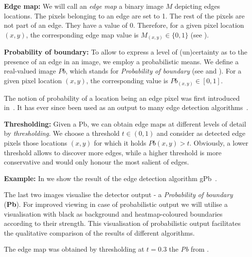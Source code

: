 \textbf{Edge map:} We will call an \textit{edge map} a binary image $M$ depicting edges locations. The pixels belonging to an edge are set to 1. The rest of the pixels are not part of an edge. They have a value of 0. Therefore, for a given pixel location $(x,y)$, the corresponding edge map value is $M_{(x,y)} \in \{0,1\}$ (see ).

\textbf{Probability of boundary:} To allow to express a level of (un)certainty as to the presence of an edge in an image, we employ a probabilistic means. We define a real-valued image $Pb$, which stands for \textit{Probability of boundary} (see  and ). For a given pixel location $(x,y)$, the corresponding value is $Pb_{(x,y)} \in [0,1]$.

The notion of probability of a location being an edge pixel was first introduced in~\cite{martin2004learning}. %
It has ever since been used as an output to many edge detection algorithms~\cite{Maire2008using,LimZD13,DollarICCV13edges,Isola2014crisp,Ganin2014n4fields,Hallman2014}.

\textbf{Thresholding:} Given a Pb, we can obtain edge maps at different levels of detail by {\it thresholding}. We choose a threshold $t\in(0,1)$ and consider as detected edge pixels those locations $(x,y)$ for which it holds %
$Pb(x,y)>t$. Obviously, a lower threshold allows to discover more edges, while a higher threshold is more conservative and would only honour the most salient of edges.

\textbf{Example:} In  we show the result of the edge detection algorithm gPb~\cite{Arbelaez11}.

The last two images visualise the detector output - a {\it Probability of boundary} ({\bf Pb}). For improved viewing in case of probabilistic output we will utilise a visualisation with black as background and heatmap-coloured boundaries according to their strength. This visualisation of probabilistic output facilitates the qualitative comparison of the results of different algorithms. 

The edge map  was obtained by thresholding at $t=0.3$ the {\it Pb} from .


